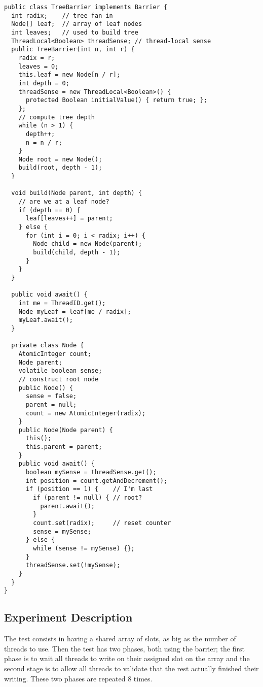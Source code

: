 \begin{lstlisting}[style=numbers]
public class TreeBarrier implements Barrier {
  int radix;    // tree fan-in
  Node[] leaf;  // array of leaf nodes
  int leaves;   // used to build tree
  ThreadLocal<Boolean> threadSense; // thread-local sense
  public TreeBarrier(int n, int r) {
    radix = r;
    leaves = 0;
    this.leaf = new Node[n / r];
    int depth = 0;
    threadSense = new ThreadLocal<Boolean>() {
      protected Boolean initialValue() { return true; };
    };
    // compute tree depth
    while (n > 1) {
      depth++;
      n = n / r;
    }
    Node root = new Node();
    build(root, depth - 1);
  }

  void build(Node parent, int depth) {
    // are we at a leaf node?
    if (depth == 0) {
      leaf[leaves++] = parent;
    } else {
      for (int i = 0; i < radix; i++) {
        Node child = new Node(parent);
        build(child, depth - 1);
      }
    }
  }

  public void await() {
    int me = ThreadID.get();
    Node myLeaf = leaf[me / radix];
    myLeaf.await();
  }
  
  private class Node {
    AtomicInteger count;
    Node parent;
    volatile boolean sense;
    // construct root node
    public Node() {
      sense = false;
      parent = null;
      count = new AtomicInteger(radix);
    }
    public Node(Node parent) {
      this();
      this.parent = parent;
    }
    public void await() {
      boolean mySense = threadSense.get();
      int position = count.getAndDecrement();
      if (position == 1) {    // I'm last
        if (parent != null) { // root?
          parent.await();
        }
        count.set(radix);     // reset counter
        sense = mySense;
      } else {
        while (sense != mySense) {};
      }
      threadSense.set(!mySense);
    }
  }
}
\end{lstlisting}
\hfill

\subsection{Experiment Description}
The test consists in having a shared array of slots, as big as the
number of threads to use. Then the test has two phases, both using the
barrier; the first phase is to wait all threads to write on their
assigned slot on the array and the second stage is to allow all
threads to validate that the rest actually finished their
writing. These two phases are repeated 8 times. \\

